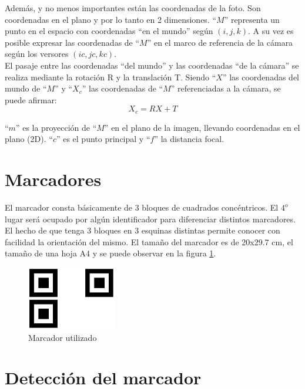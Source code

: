 \documentclass[main]{subfiles}
\begin{document}
Además, y no menos importantes están las coordenadas de la foto. Son coordenadas en el plano y por lo tanto en 2 dimensiones. ``$M$'' representa un punto en el espacio con coordenadas ``en el mundo'' según $(i,j,k)$. A su vez es posible expresar las coordenadas de ``$M$'' en el marco de referencia de la cámara según los versores $(ic,jc,kc)$.\\

El pasaje entre las coordenadas ``del mundo'' y las coordenadas ``de la cámara'' se realiza mediante la rotación R y la translación T.
Siendo ``$X$'' las coordenadas del mundo de ``$M$'' y ``$X_c$'' las coordenadas de ``$M$'' referenciadas a la cámara, se puede afirmar:
$$X_c = R X + T$$

``$m$'' es la proyección de ``$M$'' en el plano de la imagen, llevando coordenadas en el plano (2D). ``$c$'' es el punto principal y ``$f$'' la distancia focal.

\section{Marcadores}

El marcador consta básicamente de 3 bloques de cuadrados concéntricos. El $4^o$ lugar será ocupado por algún identificador para diferenciar distintos marcadores. El hecho de que tenga 3 bloques en 3 esquinas distintas permite conocer con facilidad la orientación del mismo. El tamaño del marcador es de 20x29.7 cm, el tamaño de una hoja A4 y se puede observar en la figura \ref{fig:marcador}.

\begin{figure}
	\begin{center}
		\includegraphics[width=0.35\textwidth]{./pics_camara/marcador.jpg}
	\end{center}
	\caption{Marcador utilizado}
	\label{fig:marcador}
\end{figure}

\section{Detección del marcador}
\end{document}
